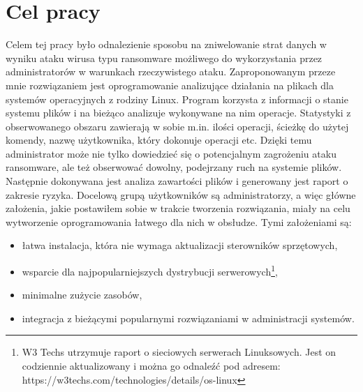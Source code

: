 \section{Cel pracy}
Celem tej pracy było odnalezienie sposobu na zniwelowanie strat danych w wyniku ataku wirusa typu ransomware możliwego do wykorzystania przez administratorów w warunkach rzeczywistego ataku. Zaproponowanym przeze mnie rozwiązaniem jest oprogramowanie analizujące działania na plikach dla systemów operacyjnych z rodziny Linux.
 Program korzysta z informacji o stanie systemu plików i na bieżąco analizuje wykonywane na nim operacje. Statystyki z obserwowanego obszaru zawierają w sobie m.in. ilości operacji, ścieżkę do użytej komendy, nazwę użytkownika, który dokonuje operacji etc. Dzięki temu administrator może nie tylko dowiedzieć się o potencjalnym zagrożeniu ataku ransomware, ale też obserwować dowolny, podejrzany ruch na systemie plików. Następnie dokonywana jest analiza zawartości plików i generowany jest raport o zakresie ryzyka.
Docelową grupą użytkowników są administratorzy, a więc główne założenia, jakie postawiłem sobie w trakcie tworzenia rozwiązania, miały na celu wytworzenie oprogramowania łatwego dla nich w obsłudze. Tymi założeniami są:
\begin{itemize}
    \item łatwa instalacja, która nie wymaga aktualizacji sterowników sprzętowych,
    \item wsparcie dla najpopularniejszych dystrybucji serwerowych\footnote{W3 Techs utrzymuje raport o sieciowych serwerach Linuksowych. Jest on codziennie aktualizowany i można go odnaleźć pod adresem: https://w3techs.com/technologies/details/os-linux},
    \item minimalne zużycie zasobów,
    \item integracja z bieżącymi popularnymi rozwiązaniami w administracji systemów.
\end{itemize}


